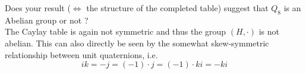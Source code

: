 Does your result ($\Leftrightarrow$ the structure of the completed table) suggest that $Q_8$ is an Abelian group or not ?
\color{blue} \\[1ex]
The Caylay table is again not symmetric and thus the group $(H, \cdot)$ is not abelian. This can also directly be seen by the somewhat skew-symmetric relationship between unit quaternions, i.e.
$$ ik = -j = (-1) \cdot j = (-1) \cdot ki = -ki $$
\color{black}
\newpage






